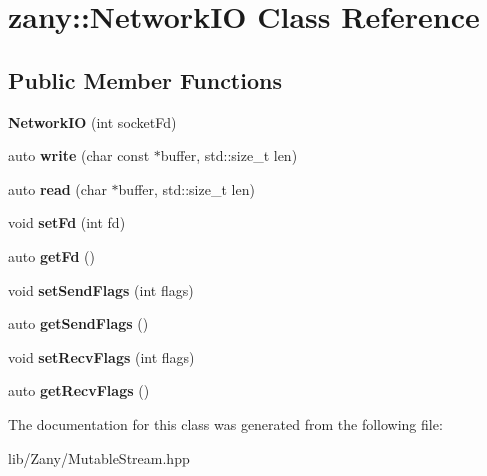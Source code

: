 \hypertarget{classzany_1_1_network_i_o}{}\section{zany\+:\+:Network\+IO Class Reference}
\label{classzany_1_1_network_i_o}
\subsection*{Public Member Functions}
\begin{DoxyCompactItemize}
\item 
\mbox{\label{classzany_1_1_network_i_o_a37586b6848566f7f552e0cdd0ec0435a}} 
{\bfseries Network\+IO} (int socket\+Fd)
\item 
\mbox{\label{classzany_1_1_network_i_o_ac46bc098d2e34988c947108a1fc7b467}} 
auto {\bfseries write} (char const $\ast$buffer, std\+::size\+\_\+t len)
\item 
\mbox{\label{classzany_1_1_network_i_o_ae71cad6d2613ba1d483734ee5046f8ef}} 
auto {\bfseries read} (char $\ast$buffer, std\+::size\+\_\+t len)
\item 
\mbox{\label{classzany_1_1_network_i_o_aa4de3047bc6d056c1038821bc5f76b73}} 
void {\bfseries set\+Fd} (int fd)
\item 
\mbox{\label{classzany_1_1_network_i_o_aae3e9589b2890928d43dbf335e65eedf}} 
auto {\bfseries get\+Fd} ()
\item 
\mbox{\label{classzany_1_1_network_i_o_a86d7808c17524dd56604a8c6f8e4d3b8}} 
void {\bfseries set\+Send\+Flags} (int flags)
\item 
\mbox{\label{classzany_1_1_network_i_o_a36d1f6111d4fb71e868e1899e8ce35a6}} 
auto {\bfseries get\+Send\+Flags} ()
\item 
\mbox{\label{classzany_1_1_network_i_o_a40b92055cf1117a3c045d8643e8332b0}} 
void {\bfseries set\+Recv\+Flags} (int flags)
\item 
\mbox{\label{classzany_1_1_network_i_o_a7fa3a529c9dc9483c3cc4146f4038452}} 
auto {\bfseries get\+Recv\+Flags} ()
\end{DoxyCompactItemize}


The documentation for this class was generated from the following file\+:\begin{DoxyCompactItemize}
\item 
lib/\+Zany/Mutable\+Stream.\+hpp\end{DoxyCompactItemize}
